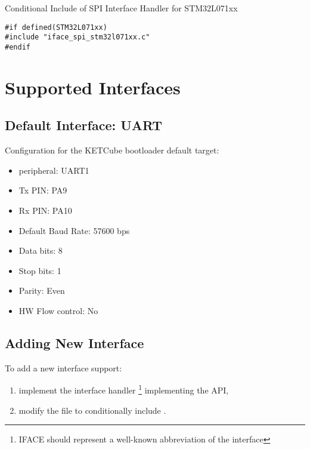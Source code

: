 \begin{docCodeExampleTitled}{Conditional Include of SPI Interface Handler for STM32L071xx}
\begin{verbatim}
#if defined(STM32L071xx) 
#include "iface_spi_stm32l071xx.c"
#endif
\end{verbatim}
\end{docCodeExampleTitled}


\clearpage
\section{Supported Interfaces}

\subsection{Default Interface: UART}

Configuration for the KETCube bootloader default target:
\begin{itemize}
  \item peripheral: UART1
  \item Tx PIN: PA9
  \item Rx PIN: PA10
  \item Default Baud Rate: 57600 bps
  \item Data bits: 8
  \item Stop bits: 1
  \item Parity: Even
  \item HW Flow control: No
\end{itemize}


\subsection{Adding New Interface}

To add a new interface support:
\begin{enumerate}
\item implement the interface handler \footnote{IFACE should represent a well-known abbreviation of the interface} implementing the  API,
\item modify the  file to conditionally include .
\end{enumerate}

